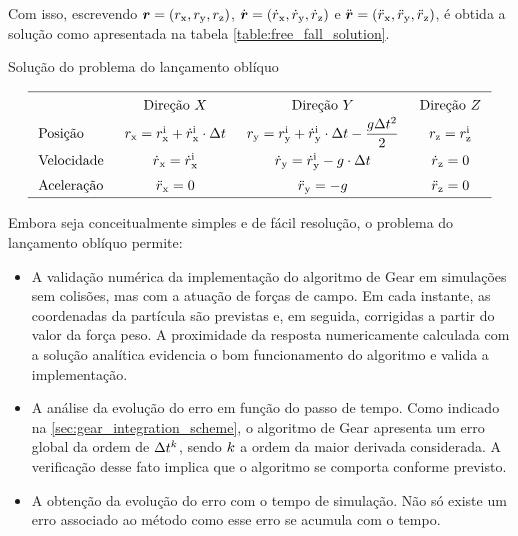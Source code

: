 Com isso, escrevendo \(\position = \explicitVectorCoordinates{\positionScalar}\), \(\velocity = \explicitVectorCoordinates{\velocityScalar}\) e \(\acceleration = \explicitVectorCoordinates{\accelerationScalar}\), é obtida a solução como apresentada na tabela \ref{table:free_fall_solution}.

\begin{table}[h]
	\caption{Solução do problema do lançamento oblíquo}
	\label{table:free_fall_solution}

	\begin{equation*}
		\arraycolsep=1.5\arraycolsep
		\def\arraystretch{1.5}
		\begin{array}{lccc}
	\hline
		& \text{Direção } \xAxis 
		& \text{Direção } \yAxis 
		& \text{Direção } \zAxis
		\\
	\text{Posição} 
		& \positionx = \initial{\positionx} + \initial{\velocityx}\cdot \Dt
		& \positiony = \initial{\positiony} + \initial{\velocityy}\cdot \Dt - \dfrac{\gravityScalar\Dt^2}{2}
		& \positionz = \initial{\positionz} \\
	\text{Velocidade} 
		& \velocityx = \initial{\velocityx}
		& \velocityy = \initial{\velocityy} - \gravityScalar\cdot \Dt
		& \velocityz = 0 \\
	\text{Aceleração} 
		& \accelerationx = 0
		& \accelerationy = - \gravityScalar
		& \accelerationz = 0 \\
	\hline	
		\end{array}
	\end{equation*}
\end{table}

Embora seja conceitualmente simples e de fácil resolução, o problema do lançamento oblíquo permite:
\begin{itemize}
\item A validação numérica da implementação do algoritmo de Gear em simulações sem colisões, mas com a atuação de forças de campo. Em cada instante, as coordenadas da partícula são previstas e, em seguida, corrigidas a partir do valor da força peso. A proximidade da resposta numericamente calculada com a solução analítica evidencia o bom funcionamento do algoritmo e valida a implementação.
\item A análise da evolução do erro em função do passo de tempo. Como indicado na \autoref{sec:gear_integration_scheme}, o algoritmo de Gear apresenta um erro global da ordem de \(\Delta t^k\), sendo \(k\) a ordem da maior derivada considerada. A verificação desse fato implica que o algoritmo se comporta conforme previsto.
\item A obtenção da evolução do erro com o tempo de simulação. Não só existe um erro associado ao método como esse erro se acumula com o tempo.
\end{itemize}

